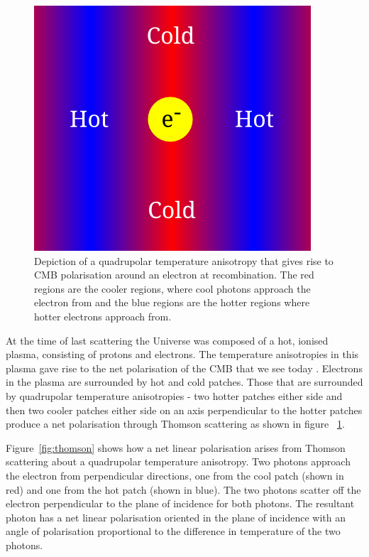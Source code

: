 \begin{figure}[h]
\centering
\includegraphics[scale=0.5]{images/quadrupole.png}
\caption{Depiction of a quadrupolar temperature anisotropy that gives rise to CMB polarisation around an electron at recombination. The red regions are the cooler regions, where cool photons approach the electron from and the blue regions are the hotter regions where hotter electrons approach from.}
\label{fig:quadrupole}
\end{figure}

At the time of last scattering the Universe was composed of a hot, ionised plasma, consisting of protons and electrons. The temperature anisotropies in this plasma gave rise to the net polarisation of the CMB that we see today \cite{Hu:1997hv}.
Electrons in the plasma are surrounded by hot and cold patches. Those that are surrounded by quadrupolar temperature anisotropies - two hotter patches either side and then two cooler patches either side on an axis perpendicular to the hotter patches produce a net polarisation through Thomson scattering as shown in figure ~\ref{fig:quadrupole}.

Figure~\ref{fig:thomson} shows how a net linear polarisation arises from Thomson scattering about a quadrupolar temperature anisotropy. Two photons approach the electron from perpendicular directions, one from the cool patch (shown in red) and one from the hot patch (shown in blue). The two photons scatter off the electron perpendicular to the plane of incidence for both photons. The resultant photon has a net linear polarisation oriented in the plane of incidence with an angle of polarisation proportional to the difference in temperature of the two photons. 

